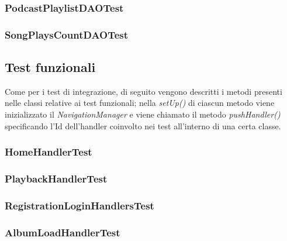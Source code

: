\documentclass{article}
\begin{document}
  \subsubsection{PodcastPlaylistDAOTest}

  \subsubsection{SongPlaysCountDAOTest}

  \subsection{Test funzionali}
  Come per i test di integrazione, di seguito vengono descritti i metodi presenti nelle classi relative ai test funzionali; nella \textit{setUp()} di ciascun metodo viene inizializzato il \textit{NavigationManager} e viene chiamato il metodo \textit{pushHandler()} specificando l'Id dell'handler coinvolto nei test all'interno di una certa classe.

  \subsubsection{HomeHandlerTest}

  \subsubsection{PlaybackHandlerTest}

  \subsubsection{RegistrationLoginHandlersTest}

  \subsubsection{AlbumLoadHandlerTest}
\end{document}
